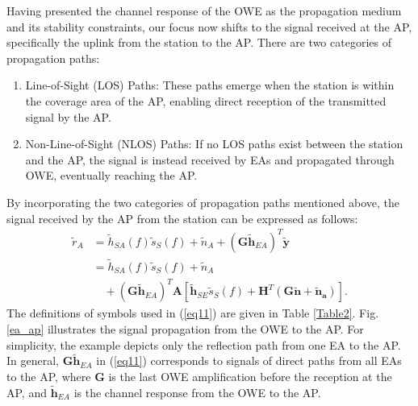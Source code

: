 Having presented the channel response of the OWE as the propagation medium and its stability constraints, our focus now shifts to the signal received at the AP, specifically the uplink from the station to the AP. There are two categories of propagation paths:
\begin{enumerate}
    \item Line-of-Sight (LOS) Paths: These paths emerge when the station is within the coverage area of the AP, enabling direct reception of the transmitted signal by the AP.
    \item Non-Line-of-Sight (NLOS) Paths: If no LOS paths exist between the station and the AP, the signal is instead received by EAs and propagated through OWE, eventually reaching the AP.
\end{enumerate}
By incorporating the two categories of propagation paths mentioned above, the signal received by the AP from the station can be expressed as follows:
\begin{equation}
\label{eq11}
\begin{aligned}
{{\tilde r}_{A}} 
&={{\tilde h}_{SA}}\left( f \right){{\tilde s}_{S}}\left( f \right)
+ {{\tilde n}_{A}} + {\left( {\mathbf{G}{{\mathbf{\tilde h}}_{EA}}} \right)^T} \mathbf{\tilde y}\\
&={{\tilde h}_{SA}}\left( f \right){{\tilde s}_{S}}\left( f \right)
+ {{\tilde n}_{A}} \\
&\quad + {\left( {\mathbf{G}{{\mathbf{\tilde h}}_{EA}}} \right)^T}\mathbf{A}\left[ {{{\mathbf{\tilde h}}_{SE}}{{\tilde s}_{S}}\left( f \right) + {\mathbf{H}^T}\left( {\mathbf{G\tilde n + }{{\mathbf{\tilde n}}_\mathbf{a}}} \right)} \right] \text{.}
\end{aligned}
\end{equation}
The definitions of symbols used in (\ref{eq11}) are given in Table \ref{Table2}. Fig. \ref{ea_ap} illustrates the signal propagation from the OWE to the AP. For simplicity, the example depicts only the reflection path from one EA to the AP. In general, ${\mathbf{G}{{\mathbf{\tilde h}}_{EA}}}$ in (\ref{eq11}) corresponds to signals of direct paths from all EAs to the AP, where $\mathbf{G}$ is the last OWE amplification before the reception at the AP, and ${\mathbf{\tilde h}}_{EA}$ is the channel response from the OWE to the AP.


